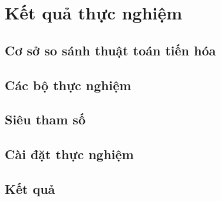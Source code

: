 \chapter{Kết quả thực nghiệm}
\label{chap:result}


\section{Cơ sở so sánh thuật toán tiến hóa}

\newpage
\section{Các bộ thực nghiệm}

\newpage
\section{Siêu tham số}

\newpage
\section{Cài đặt thực nghiệm}

\newpage
\section{Kết quả}

\newpage
